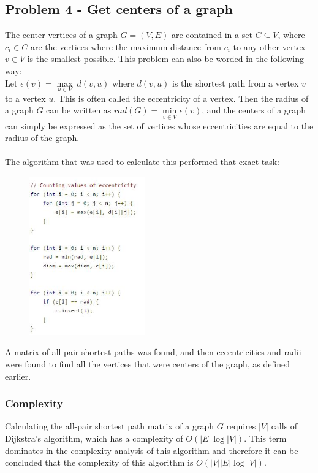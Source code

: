\documentclass[11pt]{article}
\begin{document}
	\subsection{Problem 4 - Get centers of a graph}
	The center vertices of a graph \(G = (V,E)\) are contained in a set \(C \subseteq V\), where \(c_i \in C\) are the vertices where the maximum distance from \(c_i\) to any other vertex \(v \in V\) is the smallest possible. This problem can also be worded in the following way: \\
	Let \(\epsilon (v) = \max\limits_{u \in V} \ d(v,u)\) where \(d(v,u)\) is the shortest path from a vertex \(v\) to a vertex \(u\). This is often called the eccentricity of a vertex. Then the radius of a graph \(G\) can be written as \(rad(G) = \min\limits_{v \in V} \epsilon (v) \), and the centers of a graph can simply be expressed as the set of vertices whose eccentricities are equal to the radius of the graph. \cite{centers}
	\\
	\\
	The algorithm that was used to calculate this performed that exact task:
		\begin{figure}[h!]
		\centering
		\includegraphics[width=50mm,scale=0.5]{images/centers.jpg}
		\end{figure}
	\newline
	A matrix of all-pair shortest paths was found, and then eccentricities and radii were found to find all the vertices that were centers of the graph, as defined earlier. 
	\subsubsection{Complexity} 
	Calculating the all-pair shortest path matrix of a graph \(G\) requires \(|V|\) calls of Dijkstra's algorithm, which has a complexity of \(O(|E|\log|V|)\). This term dominates in the complexity analysis of this algorithm and therefore it can be concluded that the complexity of this algorithm is \(O(|V||E|\log|V|)\).
\end{document}
